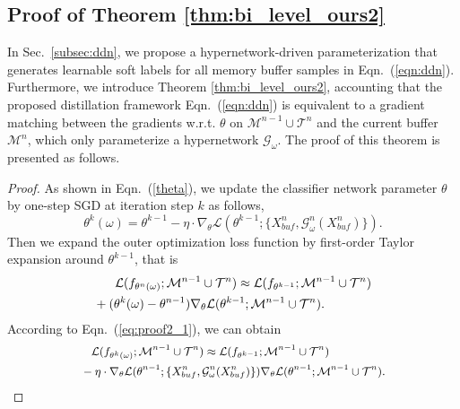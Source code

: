 \documentclass[table, xcdraw]{article}
\theoremstyle{plain}
\theoremstyle{definition}
\theoremstyle{remark}
\begin{document}
\subsection{Proof of Theorem \ref{thm:bi_level_ours2}}
In Sec.~\ref{subsec:ddn}, we propose a hypernetwork-driven parameterization that generates learnable soft labels for all memory buffer samples in Eqn.~(\ref{eqn:ddn}). Furthermore, we introduce Theorem \ref{thm:bi_level_ours2}, accounting that the proposed distillation framework Eqn.~(\ref{eqn:ddn}) is equivalent to a gradient matching between the gradients w.r.t. $\theta$ on $\mathcal M^{n-1} \cup \mathcal T^n$ and the current buffer $\mathcal M^{n}$, which only parameterize a hypernetwork $\mathcal{G}_\omega$. The proof of this theorem is presented as follows.
\begin{proof}
    As shown in Eqn.~(\ref{theta}), we update the classifier network parameter $\theta$ by one-step SGD at iteration step $k$ as follows,
    \begin{equation}
        \theta^k(\omega) = \theta^{k-1} - \eta \cdot \nabla_\theta \mathcal{L}(\theta^{k-1}; \{{X_{buf}^n, \mathcal G_{\omega}^n(X_{buf}^n)}\}).
        \label{eq:proof2_1}
    \end{equation}
    Then we expand the outer optimization loss function by first-order Taylor expansion around $\theta^{k-1}$, that is
    \begin{equation}
    \begin{aligned} 
        &\hspace{6mm} \mathcal{L}(f_{\theta^n(\omega)};\mathcal{M}^{n-1} \cup\mathcal{T}^n)\approx \mathcal{L}(f_{\theta^{k-1}};\mathcal{M}^{n-1} \cup\mathcal{T}^n)  \\
        &+(\theta^k(\omega)-\theta^{n-1})\nabla_\theta \mathcal{L}(\theta^{k-1}; \mathcal{M}^{n-1} \cup \mathcal{T}^n).
    \label{4}
    \end{aligned}
    \end{equation}
    According to Eqn.~(\ref{eq:proof2_1}), we can obtain
    \begin{equation}
    \begin{small}
    \begin{aligned} 
        &\hspace{3mm} \mathcal{L}(f_{\theta^k(\omega)};\mathcal{M}^{n-1} \cup\mathcal{T}^n)\approx \mathcal{L}(f_{\theta^{k-1}};\mathcal{M}^{n-1} \cup\mathcal{T}^n) \\
        &-\eta \cdot
        \nabla_\theta \mathcal{L}(\theta^{n-1}; \{{X_{buf}^n, \mathcal G_{\omega}^n(X_{buf}^n)}\})\nabla_\theta \mathcal{L}(\theta^{n-1}; \mathcal{M}^{n-1} \cup \mathcal{T}^n).

\end{aligned}
\end{small}
\end{equation}
\end{proof}
\end{document}
